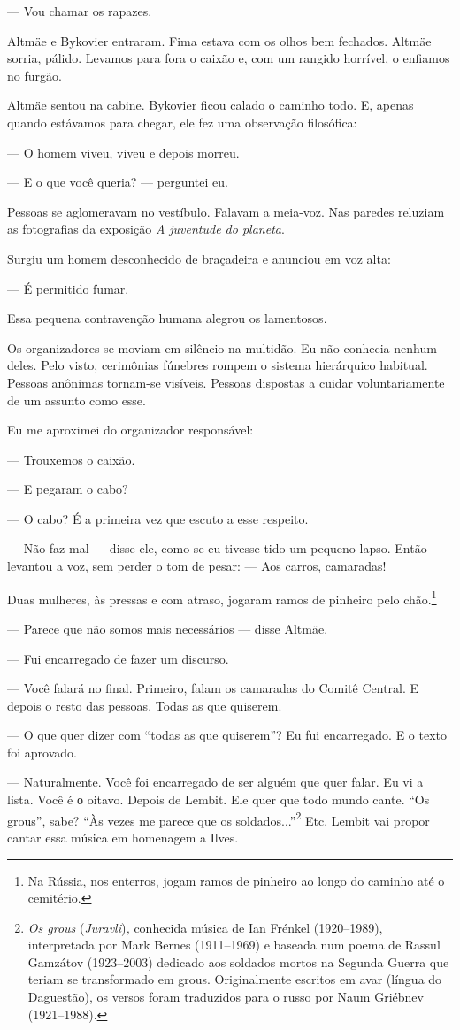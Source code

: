 --- Vou chamar os rapazes.

Altmäe e Bykovier entraram. Fima estava com os olhos bem fechados.
Altmäe sorria, pálido. Levamos para fora o caixão e, com um rangido
horrível, o enfiamos no furgão.

Altmäe sentou na cabine. Bykovier ficou calado o caminho todo. E, apenas
quando estávamos para chegar, ele fez uma observação filosófica:

--- O homem viveu, viveu e depois morreu.

--- E o que você queria? --- perguntei eu.

Pessoas se aglomeravam no vestíbulo. Falavam a meia-voz. Nas paredes
reluziam as fotografias da exposição \emph{A juventude do planeta}.

Surgiu um homem desconhecido de braçadeira e anunciou em voz alta:

--- É permitido fumar.

Essa pequena contravenção humana alegrou os lamentosos.

Os organizadores se moviam em silêncio na multidão. Eu não conhecia
nenhum deles. Pelo visto, cerimônias fúnebres rompem o sistema
hierárquico habitual. Pessoas anônimas tornam-se visíveis. Pessoas
dispostas a cuidar voluntariamente de um assunto como esse.

Eu me aproximei do organizador responsável:

--- Trouxemos o caixão.

--- E pegaram o cabo?

--- O cabo? É a primeira vez que escuto a esse respeito.

--- Não faz mal --- disse ele, como se eu tivesse tido um pequeno lapso.
Então levantou a voz, sem perder o tom de pesar: --- Aos carros,
camaradas!

Duas mulheres, às pressas e com atraso, jogaram ramos de pinheiro pelo
chão.\footnote{Na Rússia, nos enterros, jogam ramos de pinheiro ao longo
  do caminho até o cemitério.}

--- Parece que não somos mais necessários --- disse Altmäe.

--- Fui encarregado de fazer um discurso.

--- Você falará no final. Primeiro, falam os camaradas do Comitê
Central. E depois o resto das pessoas. Todas as que quiserem.

--- O que quer dizer com ``todas as que quiserem''? Eu fui encarregado.
E o texto foi aprovado.

--- Naturalmente. Você foi encarregado de ser alguém que quer falar. Eu
vi a lista. Você é о oitavo. Depois de Lembit. Ele quer que todo mundo
cante. ``Os grous'', sabe? ``Às vezes me parece que os
soldados...''\footnote{\emph{Os grous} (\emph{Juravli})\emph{,}
  conhecida música de Ian Frénkel (1920--1989), interpretada por Mark
  Bernes (1911--1969) e baseada num poema de Rassul Gamzátov
  (1923--2003) dedicado aos soldados mortos na Segunda Guerra que teriam
  se transformado em grous. Originalmente escritos em avar (língua do
  Daguestão), os versos foram traduzidos para o russo por Naum Griébnev
  (1921--1988).} Etc. Lembit vai propor cantar essa música em homenagem
a Ilves.

